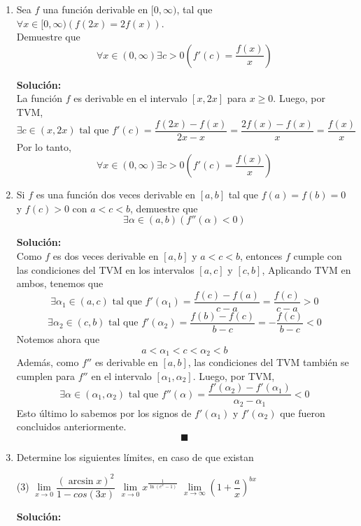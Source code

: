 \documentclass[12pt]{article}
\newenvironment{solucion}
{\begin{mdframed}[backgroundcolor=black!10]
		{\bf Solución:}\\
	}
	{
	\end{mdframed}
}
\newenvironment{preguntas}
{\begin{enumerate}\itemsep12pt
	}
	{
	\end{enumerate}
}
\newcommand{\ra}{\rightarrow}
\begin{document}
\begin{preguntas}
\begin{solucion}
Luego, $f(x_1) = 0$ y $f(x_2) = 0$. Notemos que $f$ es derivable en todos los reales. Entonces, por TVM
$$\exists c \in (x_1, x_2) \text{ tal que } f'(c) = \dfrac{f(x_2) - f(x_1)}{x_2-x_1} = 0$$
Sin embargo, notemos que
$$f'(x) = \cos x - 2 = 0 \ra \cos x = 2$$
Lo que no se cumple para ningún $x$, por lo que no existe ningún $c$ donde $f'(c) = 0$.\\

Esto es una contradicción con nuestra suposición anterior, por lo que la ecuación no puede tener dos soluciones.\\

En conclusión, la ecuación tiene solución única. 
$$\blacksquare$$
\end{solucion}
\item Sea $f$ una función derivable en $[0, \infty)$, tal que $\forall x \in [0, \infty)(f(2x)=2f(x))$.\\
Demuestre que
$$\forall x \in (0, \infty) \exists c > 0 \left(f'(c) = \dfrac{f(x)}{x}\right)$$
\begin{solucion}
La función $f$ es derivable en el intervalo $[x, 2x]$ para $x \geq 0$. Luego, por TVM,
$$\exists c \in (x,2x) \text{ tal que } f'(c) = \dfrac{f(2x)-f(x)}{2x-x} = \dfrac{2f(x)-f(x)}{x} = \dfrac{f(x)}{x}$$
Por lo tanto,
$$\forall x \in (0, \infty) \exists c > 0 \left(f'(c) = \dfrac{f(x)}{x}\right)$$
\end{solucion}
\item Si $f$ es una función dos veces derivable en $[a,b]$ tal que $f(a)=f(b)=0$ y $f(c) > 0$ con $a < c < b$, demuestre que
$$\exists \alpha \in (a,b) (f''(\alpha) < 0)$$
\begin{solucion}
Como $f$ es dos veces derivable en $[a,b]$ y $a < c < b$, entonces $f$ cumple con las condiciones del TVM en los intervalos $[a,c]$ y $[c,b]$, Aplicando TVM en ambos, tenemos que
$$\exists \alpha_1 \in (a,c) \text{ tal que } f'(\alpha_1) = \dfrac{f(c)-f(a)}{c-a} = \dfrac{f(c)}{c-a} > 0$$
$$\exists \alpha_2 \in (c,b) \text{ tal que } f'(\alpha_2) = \dfrac{f(b)-f(c)}{b-c} = -\dfrac{f(c)}{b-c} < 0$$
Notemos ahora que 
$$a < \alpha_1 < c < \alpha_2 < b$$
Además, como $f''$ es derivable en $[a, b]$, las condiciones del TVM también se cumplen para $f''$ en el intervalo $[\alpha_1, \alpha_2]$. Luego, por TVM,
$$\exists \alpha \in (\alpha_1, \alpha_2) \text{ tal que } f''(\alpha) = \dfrac{f'(\alpha_2) - f'(\alpha_1)}{\alpha_2 - \alpha_1} < 0$$
Esto último lo sabemos por los signos de $f'(\alpha_1)$ y $f'(\alpha_2)$ que fueron concluidos anteriormente.
$$\blacksquare$$
\end{solucion}
\item Determine los siguientes límites, en caso de que existan
\begin{tasks}(3)
\task $\lim\limits_{x\ra 0}\dfrac{(\arcsin x)^2}{1-cos(3x)}$
\task $\lim\limits_{x\ra 0} x^{\frac{1}{\ln (e^x-1)}}$
\task $\lim\limits_{x\ra \infty} \left(1+\dfrac{a}{x}\right)^{bx}$
\end{tasks}
\begin{solucion}


\end{solucion}
\end{preguntas}
\end{document}
